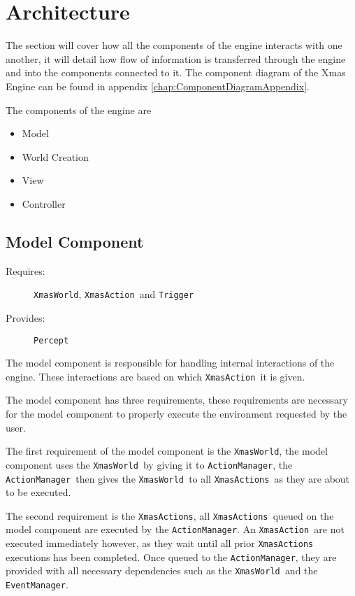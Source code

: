 
\section{Architecture}

The section will cover how all the components of the engine interacts
with one another, it will detail how flow of information is transferred
through the engine and into the components connected to it. The component
diagram of the Xmas Engine can be found in appendix \ref{chap:ComponentDiagramAppendix}.

The components of the engine are
\begin{itemize}
\item Model
\item World Creation
\item View
\item Controller
\end{itemize}

\subsection{Model Component}
\begin{description}
\item [{Requires:}] \texttt{XmasWorld}, \texttt{XmasAction }and \texttt{Trigger }
\item [{Provides:}] \texttt{Percept}
\end{description}
The model component is responsible for handling internal interactions
of the engine. These interactions are based on which \texttt{XmasAction
}it is given. 

The model component has three requirements, these requirements are
necessary for the model component to properly execute the environment
requested by the user.

The first requirement of the model component is the \texttt{XmasWorld},
the model component uses the \texttt{XmasWorld }by giving it to \texttt{ActionManager},
the \texttt{ActionManager }then gives the \texttt{XmasWorld }to all
\texttt{XmasActions }as they are about to be executed. 

The second requirement is the \texttt{XmasActions}, all \texttt{XmasActions
}queued on the model component are executed by the \texttt{ActionManager}.
An \texttt{XmasAction }are not executed immediately however, as they
wait until all prior \texttt{XmasActions} executions has been completed.
Once queued to the \texttt{ActionManager}, they are provided with
all necessary dependencies such as the \texttt{XmasWorld }and the
\texttt{EventManager}.

